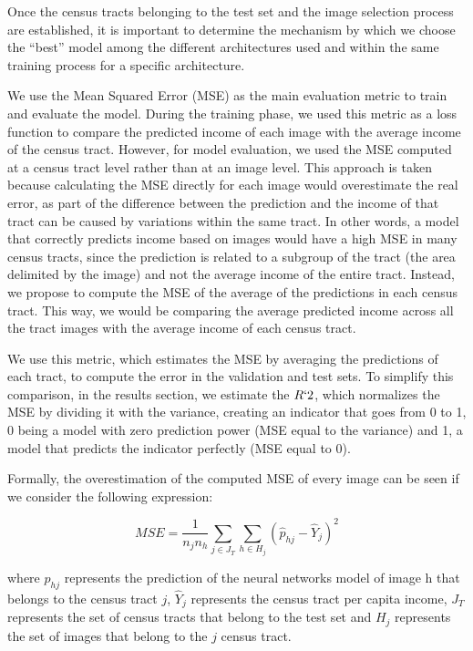 \documentclass[conference]{IEEEtran}
\begin{document}
Once the census tracts belonging to the test set and the image selection process are established, it is important to determine the mechanism by which we choose the ``best'' model among the different architectures used and within the same training process for a specific architecture.

We use the Mean Squared Error (MSE) as the main evaluation metric to train and evaluate the model. During the training phase, we used this metric as a loss function to compare the predicted income of each image with the average income of the census tract. However, for model evaluation, we used the MSE computed at a census tract level rather than at an image level. This approach is taken because calculating the MSE directly for each image would overestimate the real error, as part of the difference between the prediction and the income of that tract can be caused by variations within the same tract. In other words, a model that correctly predicts income based on images would have a high MSE in many census tracts, since the prediction is related to a subgroup of the tract (the area delimited by the image) and not the average income of the entire tract. Instead, we propose to compute the MSE of the average of the predictions in each census tract. This way, we would be comparing the average predicted income across all the tract images with the average income of each census tract.

We use this metric, which estimates the MSE by averaging the predictions of each tract, to compute the error in the validation and test sets. To simplify this comparison, in the results section, we estimate the $R`2$, which normalizes the MSE by dividing it with the variance, creating an indicator that goes from 0 to 1, 0 being a model with zero prediction power (MSE equal to the variance) and 1, a model that predicts the indicator perfectly (MSE equal to 0).

Formally, the overestimation of the computed MSE of every image can be seen if we consider the following expression:

\begin{equation} \label{MSE_img}
    MSE = \frac{1}{n_j n_h} \sum_{j \in J_T}\sum_{h \in H_j}\left(\hat{p}_{hj} - \hat{Y}_j\right)^2
\end{equation}

where $\hat{p}_{hj}$ represents the prediction of the neural networks model of image h that belongs to the census tract $j$, $\hat{Y}_j$ represents the census tract per capita income, $J_T$ represents the set of census tracts that belong to the test set and $H_j$ represents the set of images that belong to the $j$ census tract.
\end{document}
